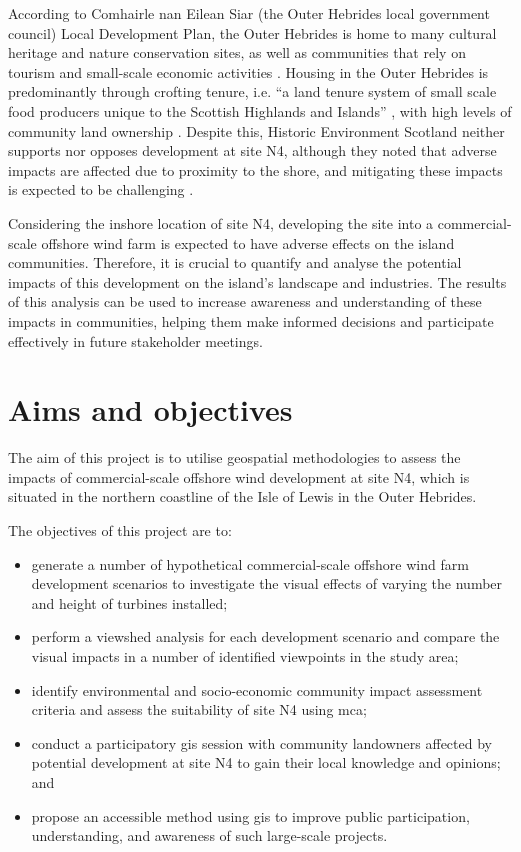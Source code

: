 According to Comhairle nan Eilean Siar (the Outer Hebrides local government
council) Local Development Plan, the Outer Hebrides is home to many cultural
heritage and nature conservation sites, as well as communities that rely on
tourism and small-scale economic activities \autocite{cnes-ldp}. Housing in the
Outer Hebrides is predominantly through crofting tenure, i.e. ``a land tenure
system of small scale food producers unique to the Scottish Highlands and
Islands'' \autocite{crofting}, with high levels of community land ownership
\autocite{cnes-ldp}. Despite this, Historic Environment Scotland neither
supports nor opposes development at site N4, although they noted that adverse
impacts are affected due to proximity to the shore, and mitigating these
impacts is expected to be challenging \autocite{govscot-smpresponses}.

Considering the inshore location of site N4, developing the site into a
commercial-scale offshore wind farm is expected to have adverse effects on the
island communities. Therefore, it is crucial to quantify and analyse the
potential impacts of this development on the island's landscape and industries.
The results of this analysis can be used to increase awareness and
understanding of these impacts in communities, helping them make informed
decisions and participate effectively in future stakeholder meetings.

\section{Aims and objectives}

The aim of this project is to utilise geospatial methodologies to assess the
impacts of commercial-scale offshore wind development at site N4, which is
situated in the northern coastline of the Isle of Lewis in the Outer Hebrides.

\noindent The objectives of this project are to:

\begin{itemize}[noitemsep]
  \item generate a number of hypothetical commercial-scale offshore wind farm
  development scenarios to investigate the visual effects of varying the number
  and height of turbines installed;
  \item perform a viewshed analysis for each development scenario and compare
  the visual impacts in a number of identified viewpoints in the study area;
  \item identify environmental and socio-economic community impact assessment
  criteria and assess the suitability of site N4 using \gls{mca};
  \item conduct a participatory \gls{gis} session with community landowners
  affected by potential development at site N4 to gain their local knowledge and
  opinions; and
  \pagebreak
  \item propose an accessible method using \gls{gis} to improve public
  participation, understanding, and awareness of such large-scale projects.
\end{itemize}
